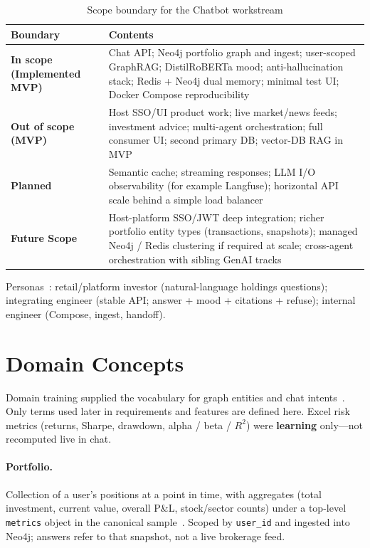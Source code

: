 \begin{table}[!htbp]
\centering
\small
\caption{Scope boundary for the Chatbot workstream}
\label{tab:scope-boundary}
\begin{tabularx}{\textwidth}{@{}
  >{\raggedright\arraybackslash}p{}
  >{\raggedright\arraybackslash}X
  @{}}
\toprule
\textbf{Boundary} & \textbf{Contents} \\
\midrule
\textbf{In scope (Implemented MVP)} &
Chat API; Neo4j portfolio graph and ingest; user-scoped GraphRAG; DistilRoBERTa mood; anti-hallucination stack; Redis + Neo4j dual memory; minimal test UI; Docker Compose reproducibility \\
\addlinespace
\textbf{Out of scope (MVP)} &
Host SSO/UI product work; live market/news feeds; investment advice; multi-agent orchestration; full consumer UI; second primary DB; vector-DB RAG in MVP \\
\addlinespace
\textbf{Planned} &
Semantic cache; streaming responses; LLM I/O observability (for example Langfuse); horizontal API scale behind a simple load balancer \\
\addlinespace
\textbf{Future Scope} &
Host-platform SSO/JWT deep integration; richer portfolio entity types (transactions, snapshots); managed Neo4j / Redis clustering if required at scale; cross-agent orchestration with sibling GenAI tracks \\
\bottomrule
\end{tabularx}
\end{table}

\noindent
Personas~\cite{prd}: retail/platform investor (natural-language holdings questions); integrating engineer (stable API; answer + mood + citations + refuse); internal engineer (Compose, ingest, handoff).

\section{Domain Concepts}

Domain training supplied the vocabulary for graph entities and chat intents~\cite{prd}. Only terms used later in requirements and features are defined here. Excel risk metrics (returns, Sharpe, drawdown, alpha / beta / $R^2$) were \textbf{learning} only---not recomputed live in chat.

\paragraph{Portfolio.}
Collection of a user's positions at a point in time, with aggregates (total investment, current value, overall P\&L, stock/sector counts) under a top-level \texttt{metrics} object in the canonical sample~\cite{prd}. Scoped by \texttt{user\_id} and ingested into Neo4j; answers refer to that snapshot, not a live brokerage feed.

